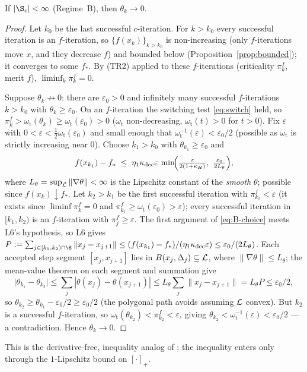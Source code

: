\begin{lemma}
  \label{lem:feas-B}
  If $|\S_c|<\infty$ (Regime~B), then $\theta_k\to0$.
\end{lemma}
\begin{proof}
  Let $k_0$ be the last successful $c$-iteration. For $k>k_0$ every successful
  iteration is an $f$-iteration, so $\{f(x_k)\}_{k>k_0}$ is non-increasing (only
  $f$-iterations move $x$, and they decrease $f$) and bounded below
  (Proposition~\ref{prop:bounded}); it converges to some $f_*$. By (TR2) applied to
  these $f$-iterations (criticality $\pi_k^f$, merit $f$),
  $\liminf_{k}\pi_k^f=0$.

  Suppose $\theta_k\not\to0$: there are $\varepsilon_0>0$ and infinitely many
  successful $f$-iterations $k>k_0$ with $\theta_k\ge\varepsilon_0$. On an
  $f$-iteration the switching test \eqref{eq:switch} held, so
  $\pi_k^f>\omega_{\mathrm t}(\theta_k)\ge\omega_{\mathrm t}(\varepsilon_0)>0$
  ($\omega_{\mathrm t}$ non-decreasing, $\omega_{\mathrm t}(t)>0$ for $t>0$). Fix
  $\varepsilon$ with
  $0<\varepsilon<\tfrac12\omega_{\mathrm t}(\varepsilon_0)$ and small enough that
  $\omega_{\mathrm t}^{-1}(\varepsilon)<\varepsilon_0/2$ (possible as
  $\omega_{\mathrm t}$ is strictly increasing near $0$). Choose $k_1>k_0$ with
  $\theta_{k_1}\ge\varepsilon_0$ and
  \begin{equation}
    \label{eq:B-choice}
    f(x_{k_1})-f_* \;\le\; \eta_1\kappa_{\mathrm{dec}}\varepsilon\,
       \min\!\Bigl(\tfrac{\varepsilon}{2(1+\kappa_H)},\ \tfrac{\varepsilon_0}{2L_\theta}\Bigr),
  \end{equation}
  where $L_\theta=\sup_{\mathcal{L}}\|\nabla\theta\|<\infty$ is the Lipschitz constant of the
  \emph{smooth} $\theta$; possible since $f(x_k)\downarrow f_*$. Let $k_2>k_1$ be the
  first successful iteration with $\pi_{k_2}^f<\varepsilon$ (it exists since
  $\liminf\pi_k^f=0$ and $\pi_{k_1}^f\ge\omega_{\mathrm t}(\varepsilon_0)>\varepsilon$);
  every successful iteration in $[k_1,k_2)$ is an $f$-iteration with $\pi_j^f\ge\varepsilon$.
  The first argument of \eqref{eq:B-choice} meets L6's hypothesis, so L6 gives
  $P:=\sum_{j\in[k_1,k_2)\cap\S}\|x_j-x_{j+1}\|\le(f(x_{k_1})-f_*)/(\eta_1\kappa_{\mathrm{dec}}\varepsilon)\le\varepsilon_0/(2L_\theta)$.
  Each accepted step segment $[x_j,x_{j+1}]$ lies in $B(x_j,\Delta_j)\subseteq\mathcal{L}$,
  where $\|\nabla\theta\|\le L_\theta$; the mean-value theorem on each segment and
  summation give
  \[
    \bigl|\theta_{k_1}-\theta_{k_2}\bigr|
      \le\sum_j|\theta(x_j)-\theta(x_{j+1})|\le L_\theta\sum_j\|x_j-x_{j+1}\|=L_\theta P\le\varepsilon_0/2,
  \]
  so $\theta_{k_2}\ge\theta_{k_1}-\varepsilon_0/2\ge\varepsilon_0/2$ (the polygonal path
  avoids assuming $\mathcal{L}$ convex).
  But $k_2$ is a successful $f$-iteration, so
  $\omega_{\mathrm t}(\theta_{k_2})<\pi_{k_2}^f<\varepsilon$, giving
  $\theta_{k_2}<\omega_{\mathrm t}^{-1}(\varepsilon)<\varepsilon_0/2$ --- a
  contradiction. Hence $\theta_k\to0$.
\end{proof}
This is the derivative-free, inequality analog of \citet[Lemma~3.21]{GouldToint2010};
the inequality enters only through the $1$-Lipschitz bound on $[\cdot]_+$.

